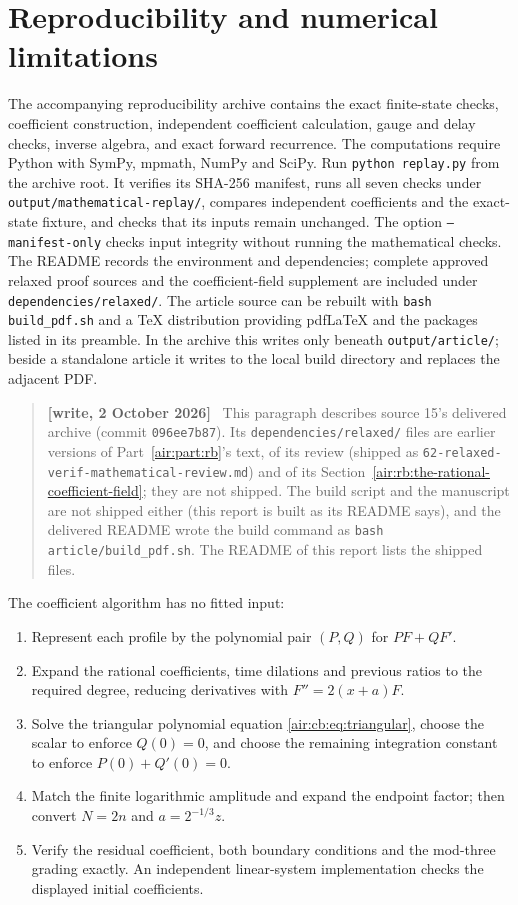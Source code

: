 \documentclass[11pt,letterpaper]{article}
\numberwithin{equation}{section}
\theoremstyle{remark}
\newenvironment{writenote}{\par\smallskip\begin{quote}\small\textbf{[write, 2 October 2026]}\ }{\end{quote}\smallskip}
\newcommand{\repopath}[1]{\nolinkurl{#1}}
\begin{document}
\section{Reproducibility and numerical limitations}\label{air:cb:sec:repro}

The accompanying reproducibility archive contains the exact finite-state
checks, coefficient construction, independent coefficient calculation,
gauge and delay checks, inverse algebra, and exact forward recurrence.
The computations require Python with SymPy, mpmath, NumPy and SciPy.
Run \texttt{python replay.py} from the archive root. It verifies its SHA-256
manifest, runs all seven checks under \texttt{output/mathematical-replay/},
compares independent coefficients and the exact-state fixture, and checks
that its inputs remain unchanged. The option \texttt{--manifest-only} checks
input integrity without running the mathematical checks. The README records
the environment and dependencies; complete approved relaxed proof sources and
the coefficient-field supplement are included under
\texttt{dependencies/relaxed/}. The article source can be rebuilt with
\texttt{bash build\_pdf.sh} and a TeX distribution providing pdfLaTeX and
the packages listed in its preamble. In the archive this writes only beneath
\texttt{output/article/}; beside a standalone article it writes to the local
build directory and replaces the adjacent PDF.
\begin{writenote}
This paragraph describes source 15's delivered archive (commit \texttt{096ee7b87}). Its \repopath{dependencies/relaxed/} files are earlier versions of Part~\ref{air:part:rb}'s text, of its review (shipped as \repopath{62-relaxed-verif-mathematical-review.md}) and of its Section~\ref{air:rb:the-rational-coefficient-field}; they are not shipped. The build script and the manuscript are not shipped either (this report is built as its README says), and the delivered README wrote the build command as \repopath{bash article/build_pdf.sh}. The README of this report lists the shipped files.
\end{writenote}


The coefficient algorithm has no fitted input:
\begin{enumerate}
\item Represent each profile by the polynomial pair $(P,Q)$ for $PF+QF'$.
\item Expand the rational coefficients, time dilations and previous ratios
to the required degree, reducing derivatives with $F''=2(x+a)F$.
\item Solve the triangular polynomial equation \eqref{air:cb:eq:triangular}, choose
the scalar to enforce $Q(0)=0$, and choose the remaining integration constant
to enforce $P(0)+Q'(0)=0$.
\item Match the finite logarithmic amplitude and expand the endpoint factor;
then convert $N=2n$ and $a=2^{-1/3}z$.
\item Verify the residual coefficient, both boundary conditions and the
mod-three grading exactly. An independent linear-system implementation
checks the displayed initial coefficients.
\end{enumerate}
\end{document}

